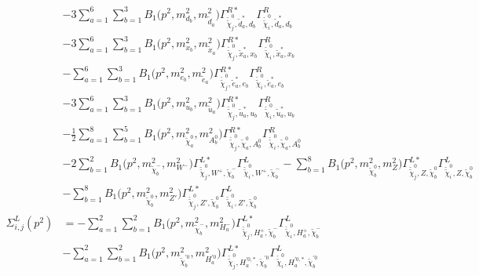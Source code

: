 \begin{itemize}
\begin{align}
 &-3 \sum_{a=1}^{6}\sum_{b=1}^{3}{B_1\Big(p^{2},m^2_{d_{{b}}},m^2_{\tilde{d}_{{a}}}\Big)} {\Gamma^{R*}_{\check{\tilde{\chi}}^0_{{j}},\tilde{d}^*_{{a}},d_{{b}}}} {\Gamma^R_{\check{\tilde{\chi}}^0_{{i}},\tilde{d}^*_{{a}},d_{{b}}}}  \nonumber \\ 
 &-3 \sum_{a=1}^{6}\sum_{b=1}^{3}{B_1\Big(p^{2},m^2_{x_{{b}}},m^2_{\tilde{x}_{{a}}}\Big)} {\Gamma^{R*}_{\check{\tilde{\chi}}^0_{{j}},\tilde{x}^*_{{a}},x_{{b}}}} {\Gamma^R_{\check{\tilde{\chi}}^0_{{i}},\tilde{x}^*_{{a}},x_{{b}}}}  \nonumber \\ 
 &- \sum_{a=1}^{6}\sum_{b=1}^{3}{B_1\Big(p^{2},m^2_{e_{{b}}},m^2_{\tilde{e}_{{a}}}\Big)} {\Gamma^{R*}_{\check{\tilde{\chi}}^0_{{j}},\tilde{e}^*_{{a}},e_{{b}}}} {\Gamma^R_{\check{\tilde{\chi}}^0_{{i}},\tilde{e}^*_{{a}},e_{{b}}}}  \nonumber \\ 
 &-3 \sum_{a=1}^{6}\sum_{b=1}^{3}{B_1\Big(p^{2},m^2_{u_{{b}}},m^2_{\tilde{u}_{{a}}}\Big)} {\Gamma^{R*}_{\check{\tilde{\chi}}^0_{{j}},\tilde{u}^*_{{a}},u_{{b}}}} {\Gamma^R_{\check{\tilde{\chi}}^0_{{i}},\tilde{u}^*_{{a}},u_{{b}}}}  \nonumber \\ 
 &-\frac{1}{2} \sum_{a=1}^{8}\sum_{b=1}^{5}{B_1\Big(p^{2},m^2_{\tilde{\chi}^0_{{a}}},m^2_{A^0_{{b}}}\Big)} {\Gamma^{R*}_{\check{\tilde{\chi}}^0_{{j}},\tilde{\chi}^0_{{a}},A^0_{{b}}}} {\Gamma^R_{\check{\tilde{\chi}}^0_{{i}},\tilde{\chi}^0_{{a}},A^0_{{b}}}}  \nonumber \\ 
 &-2 \sum_{b=1}^{2}{B_1\Big(p^{2},m^2_{\tilde{\chi}^-_{{b}}},m^2_{W^-}\Big)} {\Gamma^{L*}_{\check{\tilde{\chi}}^0_{{j}},W^+,\tilde{\chi}^-_{{b}}}} {\Gamma^L_{\check{\tilde{\chi}}^0_{{i}},W^+,\tilde{\chi}^-_{{b}}}}  - \sum_{b=1}^{8}{B_1\Big(p^{2},m^2_{\tilde{\chi}^0_{{b}}},m^2_{Z}\Big)} {\Gamma^{L*}_{\check{\tilde{\chi}}^0_{{j}},Z,\tilde{\chi}^0_{{b}}}} {\Gamma^L_{\check{\tilde{\chi}}^0_{{i}},Z,\tilde{\chi}^0_{{b}}}}  \nonumber \\ 
 &- \sum_{b=1}^{8}{B_1\Big(p^{2},m^2_{\tilde{\chi}^0_{{b}}},m^2_{{Z'}}\Big)} {\Gamma^{L*}_{\check{\tilde{\chi}}^0_{{j}},{Z'},\tilde{\chi}^0_{{b}}}} {\Gamma^L_{\check{\tilde{\chi}}^0_{{i}},{Z'},\tilde{\chi}^0_{{b}}}}  \\ 
\Sigma^L_{i,j}(p^2) &= - \sum_{a=1}^{2}\sum_{b=1}^{2}{B_1\Big(p^{2},m^2_{\tilde{\chi}^-_{{b}}},m^2_{H^-_{{a}}}\Big)} {\Gamma^{L*}_{\check{\tilde{\chi}}^0_{{j}},H^+_{{a}},\tilde{\chi}^-_{{b}}}} {\Gamma^L_{\check{\tilde{\chi}}^0_{{i}},H^+_{{a}},\tilde{\chi}^-_{{b}}}}  \nonumber \\ 
 &- \sum_{a=1}^{2}\sum_{b=1}^{2}{B_1\Big(p^{2},m^2_{\tilde{\chi}^{'0}_{{b}}},m^2_{H^{'0}_{{a}}}\Big)} {\Gamma^{L*}_{\check{\tilde{\chi}}^0_{{j}},H^{{'0},*}_{{a}},\tilde{\chi}^{'0}_{{b}}}} {\Gamma^L_{\check{\tilde{\chi}}^0_{{i}},H^{{'0},*}_{{a}},\tilde{\chi}^{'0}_{{b}}}}  \nonumber \\ 

\end{align}
\end{itemize}
